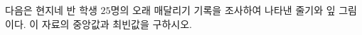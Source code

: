 다음은 현지네 반 학생 $25$명의 오래 매달리기 기록을 조사하여 나타낸 줄기와 잎 그림이다. 이 자료의 중앙값과 최빈값을 구하시오.
\par\smallskip\begin{center}\resizebox{\ifdim\width>\linewidth\linewidth\else\width\fi}{!}{}\end{center}
